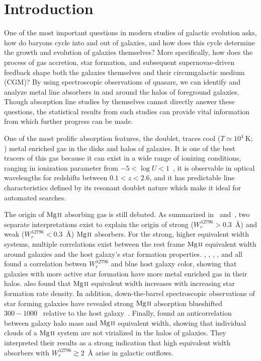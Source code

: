\documentclass[iop,apj,numberedappendix,appendixfloats,twocolappendix]{emulateapj}
\begin{document}
\section{Introduction}
\label{sec:intro}

One of the most important questions in modern studies of galactic evolution asks, how do baryons cycle into and out of galaxies, and how does this cycle determine the growth and evolution of galaxies themselves? More specifically, how does the process of gas accretion, star formation, and subsequent supernovae-driven feedback shape both the galaxies themselves and their circumgalactic medium (CGM)? By using spectroscopic observations of quasars, we can identify and analyze metal line absorbers in and around the halos of foreground galaxies. Though absorption line studies by themselves cannot directly answer these questions, the statistical results from such studies can provide vital information from which further progress can be made.

One of the most prolific absorption features, the {\MgIIdblt} doublet, traces cool ($T \simeq 10^4~\mathrm{K}$; \cite{Churchill2003}) metal enriched gas in the disks and halos of galaxies. It is one of the best tracers of this gas because it can exist in a wide range of ionizing conditions, ranging in ionization parameter from $-5 < \log U < 1$~\citep{Churchill1999}, it is observable in optical wavelengths for redshifts between $0.1 < z < 2.6$, and it has predictable line characteristics defined by its resonant doublet nature which make it ideal for automated searches. 

The origin of ${\hbox{{\rm Mg}\kern 0.1em{\sc ii}}}$ absorbing gas is still debated. As summarized in~\cite{Kacprzak2011} and~\cite{Matejek2013}, two separate interpretations exist to explain the origin of strong ($W_r^{\lambda2796} > 0.3$~{\AA}) and weak ($W_r^{\lambda2796} < 0.3$~{\AA}) ${\hbox{{\rm Mg}\kern 0.1em{\sc ii}}}$ absorbers. For the strong, higher equivalent width systems, multiple correlations exist between the rest frame ${\hbox{{\rm Mg}\kern 0.1em{\sc ii}}}$ equivalent width around galaxies and the host galaxy's star formation properties. \cite{Zibetti2007}, \cite{Lundgren2009}, \cite{Noterdaeme2010}, \cite{Bordoloi2011}, and \cite{Nestor2011} all found a correlation betwen $W_r^{\lambda2796}$ and blue host galaxy color, showing that galaxies with more active star formation have more metal enriched gas in their halos. \cite{Bordoloi2014} also found that ${\hbox{{\rm Mg}\kern 0.1em{\sc ii}}}$ equivalent width increases with increasing star formation rate density. In addition, down-the-barrel spectroscopic observations of star forming galaxies have revealed strong ${\hbox{{\rm Mg}\kern 0.1em{\sc ii}}}$ absorption blueshifted $300 - 1000$~{\kms} relative to the host galaxy~\citep{Tremonti2007,Weiner2009,Martin2009,Rubin2010}. Finally, \cite{Bouche2006} found an anticorrelation between galaxy halo mass and ${\hbox{{\rm Mg}\kern 0.1em{\sc ii}}}$ equivalent width, showing that individual clouds of a ${\hbox{{\rm Mg}\kern 0.1em{\sc ii}}}$ system are not virialized in the halos of galaxies. They interpreted their results as a strong indication that high equivalent width absorbers with $W_r^{\lambda2796} \gtrsim 2$~{\AA} arise in galactic outflows.
\end{document}
